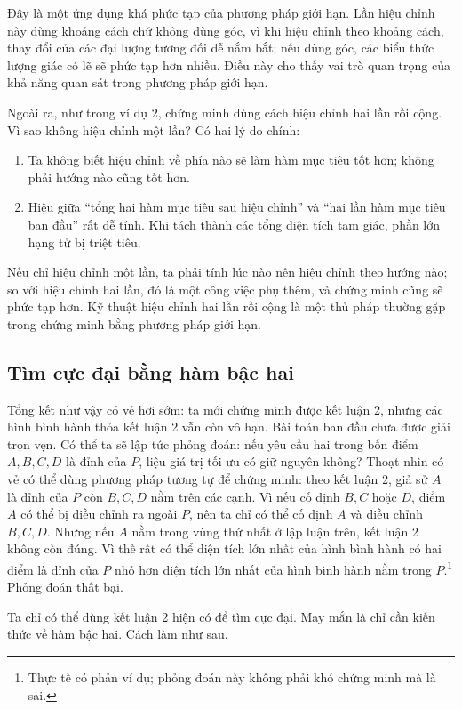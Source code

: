 \documentclass[11pt]{article}
\begin{document}
Đây là một ứng dụng khá phức tạp của phương pháp giới hạn. Lần hiệu chỉnh này
dùng khoảng cách chứ không dùng góc, vì khi hiệu chỉnh theo khoảng cách, thay
đổi của các đại lượng tương đối dễ nắm bắt; nếu dùng góc, các biểu thức lượng
giác có lẽ sẽ phức tạp hơn nhiều. Điều này cho thấy vai trò quan trọng của khả
năng quan sát trong phương pháp giới hạn.

Ngoài ra, như trong ví dụ 2, chứng minh dùng cách hiệu chỉnh hai lần rồi cộng.
Vì sao không hiệu chỉnh một lần? Có hai lý do chính:
\begin{enumerate}
  \item Ta không biết hiệu chỉnh về phía nào sẽ làm hàm mục tiêu tốt hơn; không
  phải hướng nào cũng tốt hơn.
  \item Hiệu giữa ``tổng hai hàm mục tiêu sau hiệu chỉnh'' và ``hai lần hàm
  mục tiêu ban đầu'' rất dễ tính. Khi tách thành các tổng diện tích tam giác,
  phần lớn hạng tử bị triệt tiêu.
\end{enumerate}
Nếu chỉ hiệu chỉnh một lần, ta phải tính lúc nào nên hiệu chỉnh theo hướng nào;
so với hiệu chỉnh hai lần, đó là một công việc phụ thêm, và chứng minh cũng sẽ
phức tạp hơn. Kỹ thuật hiệu chỉnh hai lần rồi cộng là một thủ pháp thường gặp
trong chứng minh bằng phương pháp giới hạn.

\subsection{Tìm cực đại bằng hàm bậc hai}

Tổng kết như vậy có vẻ hơi sớm: ta mới chứng minh được kết luận 2, nhưng các
hình bình hành thỏa kết luận 2 vẫn còn vô hạn. Bài toán ban đầu chưa được giải
trọn vẹn. Có thể ta sẽ lập tức phỏng đoán: nếu yêu cầu hai trong bốn điểm
\(A,B,C,D\) là đỉnh của \(P\), liệu giá trị tối ưu có giữ nguyên không? Thoạt
nhìn có vẻ có thể dùng phương pháp tương tự để chứng minh: theo kết luận 2,
giả sử \(A\) là đỉnh của \(P\) còn \(B,C,D\) nằm trên các cạnh. Vì nếu cố định
\(B,C\) hoặc \(D\), điểm \(A\) có thể bị điều chỉnh ra ngoài \(P\), nên ta chỉ
có thể cố định \(A\) và điều chỉnh \(B,C,D\). Nhưng nếu \(A\) nằm trong vùng
thứ nhất ở lập luận trên, kết luận 2 không còn đúng. Vì thế rất có thể diện
tích lớn nhất của hình bình hành có hai điểm là đỉnh của \(P\) nhỏ hơn diện
tích lớn nhất của hình bình hành nằm trong \(P\).\footnote{Thực tế có phản ví
dụ; phỏng đoán này không phải khó chứng minh mà là sai.} Phỏng đoán thất bại.

Ta chỉ có thể dùng kết luận 2 hiện có để tìm cực đại. May mắn là chỉ cần kiến
thức về hàm bậc hai. Cách làm như sau.
\end{document}
